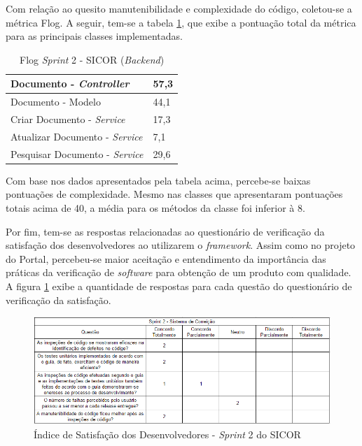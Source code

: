 Com relação ao quesito manutenibilidade e complexidade do código, coletou-se a métrica Flog. A seguir, tem-se a tabela \ref{table:tabela16}, que exibe a pontuação total da métrica para as principais classes implementadas.

\begin{table}[h]
\caption{Flog \textit{Sprint} 2 - SICOR (\textit{Backend})}
\centering
\begin{tabular}{ | m{12cm} | m{4cm} | } 
\hline
Documento - \textit{Controller} & 57,3 \\ 
\hline
Documento - Modelo & 44,1 \\ 
\hline
Criar Documento - \textit{Service} & 17,3 \\ 
\hline
Atualizar Documento - \textit{Service} & 7,1 \\ 
\hline
Pesquisar Documento - \textit{Service} & 29,6 \\
\hline
\end{tabular}
\label{table:tabela16}
\end{table}

Com base nos dados apresentados pela tabela acima, percebe-se baixas pontuações de complexidade. Mesmo nas classes que apresentaram pontuações totais acima de 40, a média para os métodos da classe foi inferior à 8.

Por fim, tem-se as respostas relacionadas ao questionário de verificação da satisfação dos desenvolvedores ao utilizarem o \textit{framework}. Assim como no projeto do Portal, percebeu-se maior aceitação e entendimento da importância das práticas da verificação de \textit{software} para obtenção de um produto com qualidade. A figura \ref{fig:satisfacaoSicor2} exibe a quantidade de respostas para cada questão do questionário de verificação da satisfação.

\begin{figure}[h]
\includegraphics[width=\textwidth]{figuras/isd_sicor_2.png}
\caption{Índice de Satisfação dos Desenvolvedores - \textit{Sprint} 2 do SICOR}
\label{fig:satisfacaoSicor2}
\end{figure}

